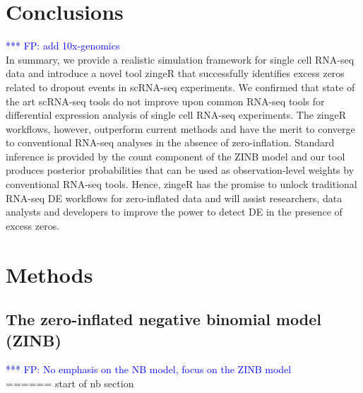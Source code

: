 \documentclass{bmcart}
\newcommand{\fanny}[1]{\textcolor{blue}{*** FP: #1}}
\begin{document}

\section*{Conclusions}
\fanny{add 10x-genomics}\\
In summary, we provide a realistic simulation framework for single cell RNA-seq data and 
introduce a novel tool zingeR that successfully identifies excess zeros related to dropout events in scRNA-seq experiments. 
We confirmed that state of the art scRNA-seq tools do not improve upon common RNA-seq tools for differential expression analysis of single cell RNA-seq experiments. 
The zingeR workflows, however, outperform current methods and have the merit to converge to conventional RNA-seq analyses in the absence of zero-inflation. 
Standard inference is provided by the count component of the ZINB model and our tool produces posterior probabilities that can be used as observation-level weights by conventional RNA-seq tools.
Hence, zingeR has the promise to unlock traditional RNA-seq DE workflows for zero-inflated data and will assist researchers, data analysts and developers to improve the power to detect DE in the presence of excess zeros. 


\section*{Methods}
\subsection*{The zero-inflated negative binomial model (ZINB)}

\fanny{No emphasis on the NB model, focus on the ZINB model}\\

====== start of nb section\\
\end{document}
